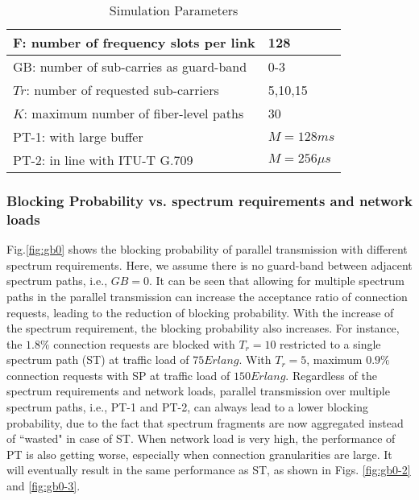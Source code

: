 \documentclass[conference]{IEEEtran}
\begin{document}
 \begin{table}
\centering
   \caption{Simulation Parameters } \label{tab:para}
\begin{tabular}{ | l | l | }
        \hline
         F: number of frequency slots per link &128 \\
        \hline
  GB: number of sub-carries  as guard-band&  0-3\\ \hline
 $Tr$: number of requested sub-carriers& 5,10,15\\ \hline
 $K$: maximum number of fiber-level paths &30  \\ \hline
PT-1:   with large buffer & $M=128ms$\\
PT-2:   in line with ITU-T G.709& $M=256\mu s$	 \\ \hline              
        \end{tabular}
\end{table}
 
 

\subsubsection{Blocking Probability  vs. spectrum requirements and network loads} Fig.\ref{fig:gb0} shows the 
blocking probability of parallel transmission with different spectrum requirements. Here, we assume there is no guard-band between adjacent spectrum paths, i.e., $GB=0$. It can be seen that allowing for multiple spectrum paths in the 
parallel transmission can increase the acceptance ratio of connection requests, leading to the reduction of blocking 
probability.  With the increase of the spectrum requirement, the blocking probability also increases. For instance, the 
$1.8\%$ connection requests are blocked with $T_r=10$ restricted to a single spectrum path (ST) at traffic load of $75 Erlang$. With $T_r=5$, maximum $0.9\%$ connection requests with SP at traffic load of $150 Erlang$. Regardless of the spectrum requirements and network loads, parallel transmission over multiple spectrum paths, i.e., PT-1 and PT-2, can always lead to a lower blocking probability, due to the fact that spectrum fragments are now aggregated instead of ``wasted" in case of ST. When network load is very high, the performance of PT is also getting worse, especially when connection granularities are large. It will eventually result in the same performance as ST, as shown in Figs. \ref{fig:gb0-2} and \ref{fig:gb0-3}.
\end{document}
